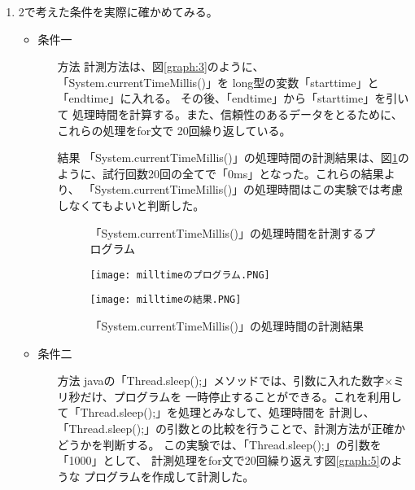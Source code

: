 \begin{enumerate}
  \item 2で考えた条件を実際に確かめてみる。
  \begin{itemize}
    \item 条件一
    \begin{itemize}
      \item[方法] 計測方法は、図\ref{graph:3}のように、「System.currentTimeMillis()」を
      long型の変数「starttime」と「endtime」に入れる。
      その後、「endtime」から「starttime」を引いて
      処理時間を計算する。また、信頼性のあるデータをとるために、これらの処理をfor文で
      20回繰り返している。
      
      \item[結果] 「System.currentTimeMillis()」の処理時間の計測結果は、図\ref{graph:4}の
      ように、試行回数20回の全てで「0ms」となった。これらの結果より、
      「System.currentTimeMillis()」の処理時間はこの実験では考慮しなくてもよいと判断した。
      \begin{figure}[htbp]
        \begin{minipage}[t]{0.5\hsize}
          \centering
          \caption{「System.currentTimeMillis()」の処理時間を計測するプログラム}
          \label{graph:3}
          \texttt{[image: milltimeのプログラム.PNG]}
        \end{minipage}
        \begin{minipage}[t]{0.45\hsize}
          \centering
          \caption{「System.currentTimeMillis()」の処理時間の計測結果}
          \label{graph:4}
          \texttt{[image: milltimeの結果.PNG]}
        \end{minipage}
      \end{figure}
    \end{itemize}
    \clearpage
    \item 条件二
    \begin{itemize}
      \item[方法] javaの「Thread.sleep();」メソッドでは、引数に入れた数字×ミリ秒だけ、プログラムを
      一時停止することができる。これを利用して「Thread.sleep();」を処理とみなして、処理時間を
      計測し、「Thread.sleep();」の引数との比較を行うことで、計測方法が正確かどうかを判断する。
      この実験では、「Thread.sleep();」の引数を「1000」として、
      計測処理をfor文で20回繰り返えす図\ref{graph:5}のような
      プログラムを作成して計測した。
      

\end{itemize}
\end{itemize}
\end{enumerate}
